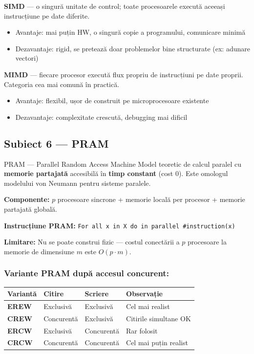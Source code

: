 \documentclass[a4paper,11pt]{article}
\newcommand{\thead}[1]{\cellcolor{tblh}\color{white}\textbf{#1}}
\newcommand{\subiect}[2]{\subsection{Subiect \textcolor{numcol}{#1} — #2}}
\begin{document}
\textbf{SIMD} — o singură unitate de control; toate procesoarele execută aceeași instrucțiune pe date diferite.
\begin{itemize}[noitemsep]
  \item Avantaje: mai puțin HW, o singură copie a programului, comunicare minimă
  \item Dezavantaje: rigid, se pretează doar problemelor bine structurate (ex: adunare vectori)
\end{itemize}

\textbf{MIMD} — fiecare procesor execută flux propriu de instrucțiuni pe date proprii. Categoria cea mai comună în practică.
\begin{itemize}[noitemsep]
  \item Avantaje: flexibil, ușor de construit pe microprocesoare existente
  \item Dezavantaje: complexitate crescută, debugging mai dificil
\end{itemize}

\subiect{6}{PRAM}

\begin{defbox}{PRAM — Parallel Random Access Machine}
Model teoretic de calcul paralel cu \textbf{memorie partajată} accesibilă în \textbf{timp constant} (cost 0). Este omologul modelului von Neumann pentru sisteme paralele.
\end{defbox}

\textbf{Componente:} $p$ procesoare sincrone + memorie locală per procesor + memorie partajată globală.

\textbf{Instrucțiune PRAM:} \lstinline|For all x in X do in parallel #instruction(x)|

\textbf{Limitare:} Nu se poate construi fizic — costul conectării a $p$ procesoare la memorie de dimensiune $m$ este $O(p \cdot m)$.

\subsubsection{Variante PRAM după accesul concurent:}

\begin{center}
\begin{tabular}{lllp{5.5cm}}
\toprule
\thead{Variantă} & \thead{Citire} & \thead{Scriere} & \thead{Observație} \\
\midrule
\textbf{EREW} & Exclusivă & Exclusivă & Cel mai realist \\
\textbf{CREW} & Concurentă & Exclusivă & Citirile simultane OK \\
\textbf{ERCW} & Exclusivă & Concurentă & Rar folosit \\
\textbf{CRCW} & Concurentă & Concurentă & Cel mai puțin realist \\
\bottomrule
\end{tabular}
\end{center}
\end{document}
